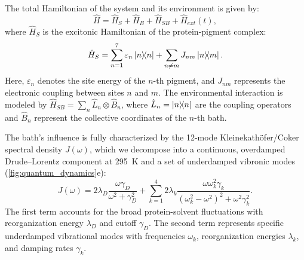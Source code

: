 \documentclass[journal=jpcl,manuscript=letter]{achemso}
\begin{document}
The total Hamiltonian of the system and its environment is given by:
\begin{equation}
\hat{H} = \hat{H}_S + \hat{H}_B + \hat{H}_{SB} + \hat{H}_{ext}(t),
\label{eq:total_hamiltonian}
\end{equation}
where $\hat{H}_S$ is the excitonic Hamiltonian of the protein-pigment complex:
\begin{equation}
\hat{H}_S = \sum_{n=1}^{7} \varepsilon_n \dyad{n} + \sum_{n \neq m} J_{nm} \dyad{n}{m}.
\label{eq:excitonic_hamiltonian}
\end{equation}
Here, $\varepsilon_n$ denotes the site energy of the $n$-th pigment, and $J_{nm}$ represents the electronic coupling between sites $n$ and $m$. The environmental interaction is modeled by $\hat{H}_{SB} = \sum_n \hat{L}_n \otimes \hat{B}_n$, where $\hat{L}_n = \dyad{n}$ are the coupling operators and $\hat{B}_n$ represent the collective coordinates of the $n$-th bath.

The bath's influence is fully characterized by the 12-mode Kleinekathöfer/Coker spectral density $J(\omega)$, which we decompose into a continuous, overdamped Drude--Lorentz component at \SI{295}{\kelvin} and a set of underdamped vibronic modes (\cref{fig:quantum_dynamics}e):
\begin{equation}
J(\omega) = 2\lambda_D \frac{\omega \gamma_D}{\omega^2 + \gamma_D^2} + \sum_{k=1}^4 2\lambda_k \frac{\omega \omega_k^2 \gamma_k}{(\omega_k^2 - \omega^2)^2 + \omega^2 \gamma_k^2}.
\label{eq:spectral_density}
\end{equation}
The first term accounts for the broad protein-solvent fluctuations with reorganization energy $\lambda_D$ and cutoff $\gamma_D$. The second term represents specific underdamped vibrational modes with frequencies $\omega_k$, reorganization energies $\lambda_k$, and damping rates $\gamma_k$.
\end{document}
